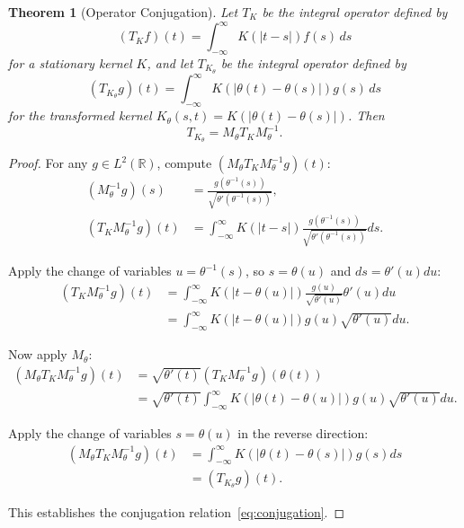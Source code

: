 \documentclass[11pt]{article}
\newtheorem{theorem}{Theorem}
\begin{document}
\begin{theorem}[Operator Conjugation]\label{thm:operator_conjugation}
Let $T_K$ be the integral operator defined by
\begin{equation}\label{eq:integral_op_original}
    (T_K f)(t) = \int_{-\infty}^{\infty} K(|t-s|) f(s)\,ds
\end{equation}
for a stationary kernel $K$, and let $T_{K_\theta}$ be the integral operator defined by
\begin{equation}\label{eq:integral_op_transformed}
    (T_{K_\theta} g)(t) = \int_{-\infty}^{\infty} K(|\theta(t)-\theta(s)|) g(s)\,ds
\end{equation}
for the transformed kernel $K_\theta(s,t) = K(|\theta(t)-\theta(s)|)$. Then
\begin{equation}\label{eq:conjugation}
    T_{K_\theta} = M_\theta T_K M_\theta^{-1}.
\end{equation}
\end{theorem}

\begin{proof}
For any $g\in L^2(\mathbb{R})$, compute $(M_\theta T_K M_\theta^{-1} g)(t)$:
\begin{align}
    (M_\theta^{-1} g)(s) &= \frac{g(\theta^{-1}(s))}{\sqrt{\theta'(\theta^{-1}(s))}},\\
    (T_K M_\theta^{-1} g)(t) &= \int_{-\infty}^{\infty} K(|t-s|) \frac{g(\theta^{-1}(s))}{\sqrt{\theta'(\theta^{-1}(s))}} ds.
\end{align}

Apply the change of variables $u = \theta^{-1}(s)$, so $s = \theta(u)$ and $ds = \theta'(u)du$:
\begin{align}
    (T_K M_\theta^{-1} g)(t) &= \int_{-\infty}^{\infty} K(|t-\theta(u)|) \frac{g(u)}{\sqrt{\theta'(u)}} \theta'(u) du\\
    &= \int_{-\infty}^{\infty} K(|t-\theta(u)|) g(u) \sqrt{\theta'(u)} du.
\end{align}

Now apply $M_\theta$:
\begin{align}
    (M_\theta T_K M_\theta^{-1} g)(t) &= \sqrt{\theta'(t)} (T_K M_\theta^{-1} g)(\theta(t))\\
    &= \sqrt{\theta'(t)} \int_{-\infty}^{\infty} K(|\theta(t)-\theta(u)|) g(u) \sqrt{\theta'(u)} du.
\end{align}

Apply the change of variables $s = \theta(u)$ in the reverse direction:
\begin{align}
    (M_\theta T_K M_\theta^{-1} g)(t) &= \int_{-\infty}^{\infty} K(|\theta(t)-\theta(s)|) g(s) ds\\
    &= (T_{K_\theta} g)(t).
\end{align}

This establishes the conjugation relation~\eqref{eq:conjugation}.
\end{proof}
\end{document}
